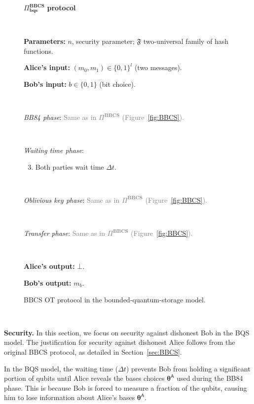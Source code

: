 \begin{figure}[h!]
\centering
\begin{tcolorbox}
    
    \centerline{$\Pi^{\textbf{BBCS}}_{\textbf{bqs}}$ \textbf{protocol}}
            
    \
    
    \textbf{Parameters:} $n$, security parameter; $\mathfrak{F}$  two-universal family of hash functions.
    
    \textbf{Alice's input:} $(m_0, m_1)\in\{0,1\}^l$ (two messages). 
    
    \textbf{Bob's input:} $b\in\{0,1\}$ (bit choice).
    
    \
    
    \textit{BB84 phase}: \textcolor{gray}{Same as in $\Pi^{\textbf{BBCS}}$ (Figure~\ref{fig:BBCS}).}
    
    
    \
    
    \textit{Waiting time phase}:
    \begin{enumerate}
    \setcounter{enumi}{2}
        \item Both parties wait time $\Delta t$.
    \end{enumerate}
    
    \
    
    \textit{Oblivious key phase}: \textcolor{gray}{Same as in $\Pi^{\textbf{BBCS}}$ (Figure~\ref{fig:BBCS}).}
     
    \
     
    \textit{Transfer phase}: \textcolor{gray}{Same as in $\Pi^{\textbf{BBCS}}$ (Figure~\ref{fig:BBCS}).}
    
    \
    
\textbf{Alice's output:} $\bot$.

\textbf{Bob's output:} $m_b$.
    
\end{tcolorbox}
    \caption{BBCS OT protocol in the bounded-quantum-storage model.}
    \label{fig:BBCS_Bounded}
\end{figure}

\

\noindent\textbf{Security.} In this section, we focus on security against dishonest Bob in the BQS model. The justification for security against dishonest Alice follows from the original BBCS protocol, as detailed in Section~\ref{sec:BBCS}.

In the BQS model, the waiting time ($\Delta t$) prevents Bob from holding a significant portion of qubits until Alice reveals the bases choices $\bm{\theta}^{\mathsf{A}}$ used during the BB84 phase. This is because Bob is forced to measure a fraction of the qubits, causing him to lose information about Alice's bases $\bm{\theta}^{\mathsf{A}}$.

